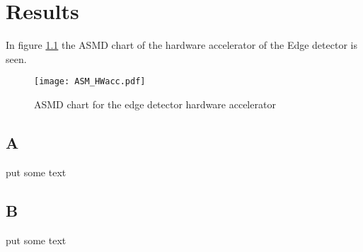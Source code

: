 \chapter{Results}

In figure \ref{fig:ASM_HW} the ASMD chart of the hardware accelerator of the Edge detector is seen.

\begin{figure}[H]
	\centering
	\texttt{[image: ASM\_HWacc.pdf]}
	\caption{ASMD chart for the edge detector hardware accelerator}
	\label{fig:ASM_HW}
\end{figure}

\section{A}
put some text

\section{B}
put some text